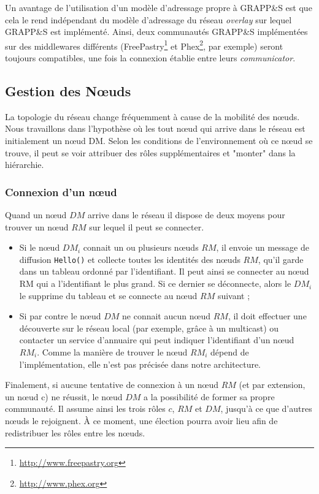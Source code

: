 Un avantage de l'utilisation d'un modèle d'adressage propre à GRAPP\&S est que cela le rend indépendant du modèle d'adressage du réseau \textit{overlay} sur lequel GRAPP\&S est implémenté. Ainsi, deux communautés GRAPP\&S implémentées sur des middlewares différents (FreePastry\footnote{\url{http://www.freepastry.org}} et Phex\footnote{\url{http://www.phex.org}}, par exemple) seront toujours compatibles, une fois la connexion établie entre leurs \textit{communicator}. 

\subsection{Gestion des N{\oe}uds}
La topologie du réseau change fréquemment à cause de la mobilité des n{\oe}uds. Nous travaillons dans l'hypothèse où les tout n{\oe}ud qui arrive dans le réseau est initialement un n{\oe}ud DM. Selon les conditions de l'environnement où ce n{\oe}ud se trouve, il peut se voir attribuer des rôles supplémentaires et "monter" dans la hiérarchie.

\subsubsection*{Connexion d'un n{\oe}ud}

Quand un n{\oe}ud $DM$ arrive dans le réseau il dispose de deux moyens pour trouver un n{\oe}ud $RM$ sur lequel il peut se connecter. 
\begin{itemize}
	\item Si le n{\oe}ud $DM_i$ connait un ou plusieurs n{\oe}uds $RM$, il envoie un message de diffusion \texttt{Hello()} et collecte toutes les identités des n{\oe}uds $RM$, qu'il garde dans un tableau ordonné par l'identifiant. Il peut ainsi se connecter au n{\oe}ud RM qui a l'identifiant le plus grand. Si ce dernier se déconnecte, alors le $DM_i$ le supprime du tableau et se connecte au n{\oe}ud $RM$ suivant ; 
	\item Si par contre le n{\oe}ud $DM$ ne connait aucun n{\oe}ud $RM$, il doit effectuer une découverte sur le réseau local (par exemple, grâce à un multicast) ou contacter un service d'annuaire qui peut indiquer l'identifiant d'un n{\oe}ud $RM_i$. Comme la manière de trouver le n{\oe}ud $RM_i$ dépend de l'implémentation, elle n'est pas précisée dans notre architecture.
\end{itemize}
Finalement, si aucune tentative de connexion à un n{\oe}ud $RM$ (et par extension, un n{\oe}ud c) ne réussit, le n{\oe}ud $DM$ a la possibilité de former sa propre communauté. Il assume ainsi les trois rôles $c$, $RM$ et $DM$, jusqu'à ce que d'autres n{\oe}uds le rejoignent. À ce moment, une élection pourra avoir lieu afin de redistribuer les rôles entre les n{\oe}uds.

